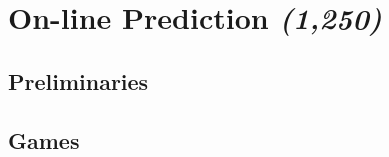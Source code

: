 \section{On-line Prediction \textit{(1,250)}}\label{section:On-line_Prediction}
\subsection{Preliminaries}
\subsection{Games}




